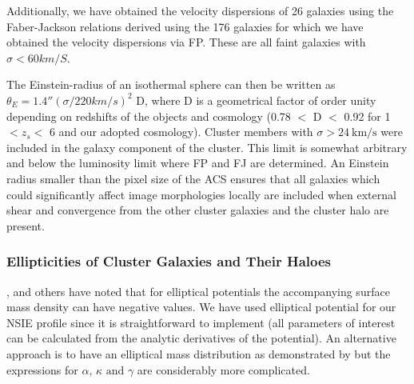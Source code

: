 \documentclass[useAMS,usenatbib]{mn2e}
\newcounter{one}   \setcounter{one}{1}
\begin{document}
Additionally, we have obtained the velocity dispersions of 26 galaxies
using the Faber-Jackson relations derived using the 176 galaxies for
which we have obtained the velocity dispersions via FP. These are all
faint galaxies with $\sigma<60km/S$.

The Einstein-radius of an isothermal sphere can then be written as
$\theta_E=1.4''(\sigma/220 km/s)^2$ D, where D is a geometrical factor
of order unity depending on redshifts of the objects and cosmology
(0.78 $<$ D $<$ 0.92 for 1 $<z_{s}<$ 6 and our adopted
cosmology). Cluster members with $\sigma>24~\mathrm{km/s}$ were
included in the galaxy component of the cluster. This limit is
somewhat arbitrary and below the luminosity limit where FP and FJ are
determined. An Einstein radius smaller than the pixel size of the ACS
ensures that all galaxies which could significantly affect image
morphologies locally are included when external shear and convergence
from the other cluster galaxies and the cluster halo are present.


\subsubsection{Ellipticities of Cluster Galaxies and Their Haloes}

\citet{blandford:87}, \citet{kormann:94} and others have noted that
for elliptical potentials the accompanying surface mass density can
have negative values. We have used elliptical potential for our NSIE
profile since it is straightforward to implement (all parameters of
interest can be calculated from the analytic derivatives of the
potential). An alternative approach is to have an elliptical mass
distribution as demonstrated by \citet{kormann:94} but the expressions
for $\alpha\textrm{, }\kappa\textrm{ and }\gamma$ are considerably
more complicated.
\end{document}
